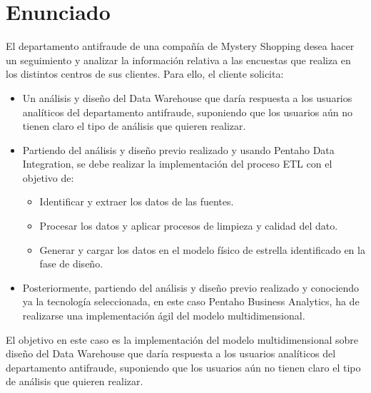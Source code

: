 \medskip
\section{Enunciado}
El departamento antifraude de una compañía de Mystery Shopping desea hacer un seguimiento y
analizar la información relativa a las encuestas que realiza en los distintos centros de sus clientes. Para
ello, el cliente solicita:

\begin{itemize}
    \item Un análisis y diseño del Data Warehouse que daría respuesta a los usuarios analíticos del
departamento antifraude, suponiendo que los usuarios aún no tienen claro el tipo de análisis
que quieren realizar.
    \item Partiendo del análisis y diseño previo realizado y usando Pentaho Data Integration, se debe
realizar la implementación del proceso ETL con el objetivo de:
    \begin{itemize}
        \item Identificar y extraer los datos de las fuentes.
        \item Procesar los datos y aplicar procesos de limpieza y calidad del dato.
        \item Generar y cargar los datos en el modelo físico de estrella identificado en la fase de diseño.
    \end{itemize}

    \item Posteriormente, partiendo del análisis y diseño previo realizado y conociendo ya la tecnología
seleccionada, en este caso Pentaho Business Analytics, ha de realizarse una implementación
ágil del modelo multidimensional.
\end{itemize}


El objetivo en este caso es la implementación del modelo multidimensional sobre diseño del Data
Warehouse que daría respuesta a los usuarios analíticos del departamento antifraude, suponiendo que los
usuarios aún no tienen claro el tipo de análisis que quieren realizar.

